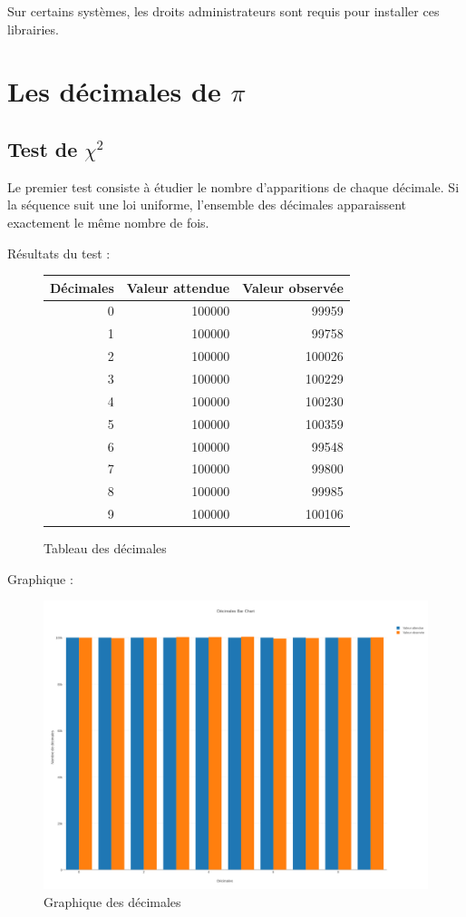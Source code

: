 \documentclass[10pt,a4paper]{article}
\begin{document}
	Sur certains systèmes, les droits administrateurs sont requis pour installer ces librairies.
	
	\newpage
	\section{Les décimales de $\pi$}
	
	\subsection{Test de $\chi^2$}
	Le premier test consiste à étudier le nombre d'apparitions de chaque décimale. Si la séquence suit une loi uniforme, l'ensemble des décimales apparaissent exactement le même nombre de fois.
	
	
	Résultats du test :
	\begin{figure}[h]
		\centering
		\begin{tabular}{|r|r|r|}
			\hline
			Décimales & Valeur attendue & Valeur observée\\
			\hline
			0 & 100000 & 99959\\
			1 & 100000 & 99758\\
			2 & 100000 & 100026\\
			3 & 100000 & 100229\\
			4 & 100000 & 100230\\
			5 & 100000 & 100359\\
			6 & 100000 & 99548\\
			7 & 100000 & 99800\\
			8 & 100000 & 99985\\
			9 & 100000 & 100106\\
			\hline
		\end{tabular}
		\caption{Tableau des décimales}
	\end{figure}
	
	Graphique :
	\begin{figure}[h]
		\centering
		\includegraphics[scale=0.25]{../chart_images/decimales_bar_chart.png}
		\caption{Graphique des décimales}
	\end{figure}
	
\end{document}
